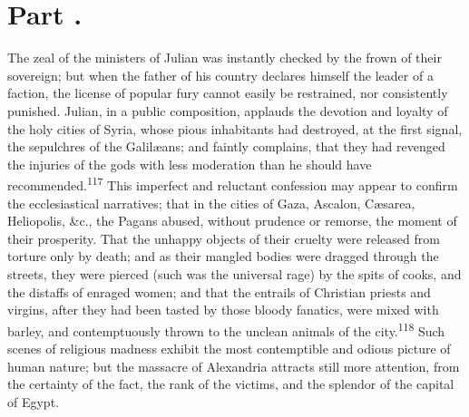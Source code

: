 

\section{Part \thesection.}

The zeal of the ministers of Julian was instantly checked by the
frown of their sovereign; but when the father of his country
declares himself the leader of a faction, the license of popular
fury cannot easily be restrained, nor consistently punished.
Julian, in a public composition, applauds the devotion and
loyalty of the holy cities of Syria, whose pious inhabitants had
destroyed, at the first signal, the sepulchres of the Galilæans;
and faintly complains, that they had revenged the injuries of the
gods with less moderation than he should have recommended.\textsuperscript{117}
This imperfect and reluctant confession may appear to confirm the
ecclesiastical narratives; that in the cities of Gaza, Ascalon,
Cæsarea, Heliopolis, \&c., the Pagans abused, without prudence or
remorse, the moment of their prosperity. That the unhappy objects
of their cruelty were released from torture only by death; and as
their mangled bodies were dragged through the streets, they were
pierced (such was the universal rage) by the spits of cooks, and
the distaffs of enraged women; and that the entrails of Christian
priests and virgins, after they had been tasted by those bloody
fanatics, were mixed with barley, and contemptuously thrown to
the unclean animals of the city.\textsuperscript{118} Such scenes of religious
madness exhibit the most contemptible and odious picture of human
nature; but the massacre of Alexandria attracts still more
attention, from the certainty of the fact, the rank of the
victims, and the splendor of the capital of Egypt.

